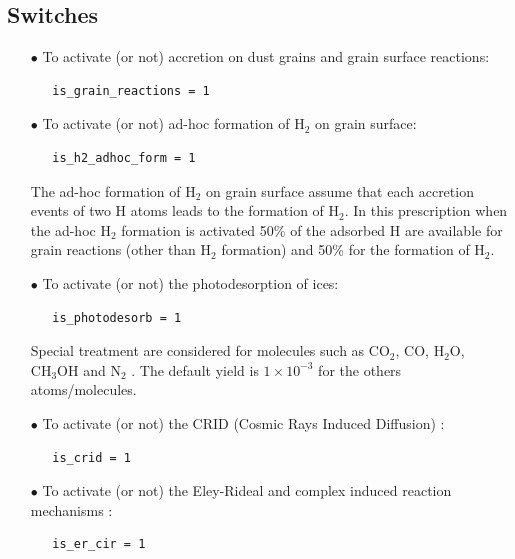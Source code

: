\documentclass[english,a4paper,twoside]{article}
\newcommand{\molecule}[1]{\ensuremath{\mathrm{#1}}}
\begin{document}
\subsection{Switches}
\begin{itemize}
   \item[$\bullet$] To activate (or not) accretion on dust grains and grain surface reactions:
   \begin{verbatim}
   is_grain_reactions = 1
   \end{verbatim}

   \item[$\bullet$] To activate (or not) ad-hoc formation of $\molecule{H_2}$ on grain surface:
   \begin{verbatim}
   is_h2_adhoc_form = 1
   \end{verbatim}
   \begin{remarque}
   The ad-hoc formation of $\molecule{H_2}$ on grain surface assume that each accretion events of two H atoms leads to the formation of $\molecule{H_2}$. In this prescription when the ad-hoc $\molecule{H_2}$ formation is activated 50\% of the adsorbed H are available for grain reactions (other than $\molecule{H_2}$ formation) and 50\% for the formation of $\molecule{H_2}$.
   \end{remarque}

   \item[$\bullet$] To activate (or not) the photodesorption of ices: 
   \begin{verbatim}
   is_photodesorb = 1
   \end{verbatim}
   \begin{remarque}
   Special treatment are considered for molecules such as $\molecule{CO_2}$, $\molecule{CO}$, $\molecule{H_2O}$, $\molecule{CH_3OH}$ and $\molecule{N_2}$ \citep{2009A&A...504..891O,2009ApJ...693.1209O,2009A&A...496..281O}. The default yield is $1\times10^{-3}$ for the others atoms/molecules.
   \end{remarque}

   \item[$\bullet$] To activate (or not) the CRID (Cosmic Rays Induced Diffusion) \citep{2014MNRAS.440.3557R}: 
   \begin{verbatim}
   is_crid = 1
   \end{verbatim}

   \item[$\bullet$] To activate (or not) the Eley-Rideal and complex induced reaction mechanisms \citep{2015MNRAS.447.4004R}: 
   \begin{verbatim}
   is_er_cir = 1
   \end{verbatim}


\end{itemize}
\end{document}
